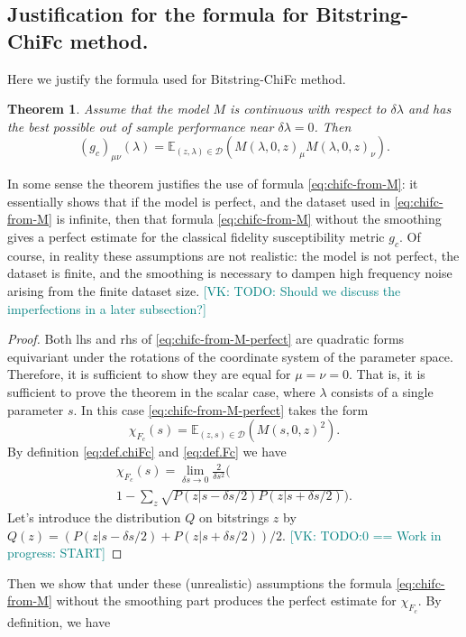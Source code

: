 \documentclass[
  american,aps,pra,reprint,floatfix,nofootinbib,superscriptaddress
]{revtex4-2}
\newtheorem{theorem}{Theorem}
\newcommand{\VK}[1]{\textcolor{teal}{[VK: #1]}}
\begin{document}
\subsection{Justification for the formula for Bitstring-ChiFc method.}
Here we justify the formula used for Bitstring-ChiFc
method.
\begin{theorem}
    Assume that the model $M$ is continuous with respect to
    $\delta \lambda$ and
    has the best possible out of sample performance
    near $\delta \lambda = 0$.
    Then
    \begin{equation}
      \label{eq:chifc-from-M-perfect}
      \left(g_{c}\right)_{\mu\nu}(\lambda) =
        \mathbb{E}_{(z, \lambda) \in \mathcal{D}}
        \left(
          M(\lambda, 0, z)_{\mu}M(\lambda, 0, z)_{\nu}
        \right).
    \end{equation}
\end{theorem}
In some sense the theorem justifies the use of formula
\eqref{eq:chifc-from-M}: it essentially shows that if the model
is perfect, and the dataset used in \eqref{eq:chifc-from-M} is
infinite, then that formula \eqref{eq:chifc-from-M} without the
smoothing gives a perfect estimate for the classical fidelity
susceptibility metric $g_c$. Of course, in reality these assumptions are not realistic: the model is not perfect, the dataset is finite, and the smoothing is necessary to dampen high frequency noise arising from the finite dataset size.
\VK{TODO: Should we discuss the imperfections
in a later subsection?}
\begin{proof}
  Both lhs and rhs of \eqref{eq:chifc-from-M-perfect} are 
  quadratic forms equivariant under the rotations of the 
  coordinate system of the parameter space. Therefore,
  it is sufficient to show they are equal for $\mu = \nu = 0$.
  That is, it is sufficient to prove the theorem in the scalar 
  case, where $\lambda$ consists of a single parameter $s$.
  In this case \eqref{eq:chifc-from-M-perfect} takes the form
  \begin{equation}
      \label{eq:chifc-from-M-perfect-s}
      \chi_{F_c}(s) =
        \mathbb{E}_{(z, s) \in \mathcal{D}} \left(
        M(s, 0, z)^2\right).
  \end{equation}
  By definition \eqref{eq:def.chiFc} and \eqref{eq:def.Fc} we
  have
  \begin{multline}
    \chi_{F_c}(s) = \lim_{\delta s \to 0} \frac{2}{\delta s^2}
    \Biggl(\\
      1-\sum_{z} \sqrt{P(z|s - \delta s / 2) P(z|s+\delta s/2)}
    \Biggr).
  \end{multline}
  Let's introduce the distribution $Q$ on bitstrings $z$
  by $Q(z) = (P(z|s - \delta s / 2) + P(z|s+\delta s/2)) / 2$.
  \VK{TODO:0 == Work in progress: START}
\end{proof}
Then we show that under these (unrealistic) assumptions
the formula \eqref{eq:chifc-from-M}
without the smoothing part produces the perfect estimate for $\chi_{F_c}$.
By definition, we have
\end{document}
